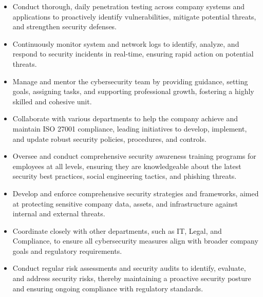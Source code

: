 \documentclass[10pt, letterpaper]{article}
\newenvironment{highlights}{
    \begin{itemize}[
        topsep=0.10 cm,
        parsep=0.10 cm,
        partopsep=0pt,
        itemsep=0pt,
        leftmargin=0 cm + 10pt
    ]
}{
    \end{itemize}
} %
\begin{document}
        \vspace{0.10 cm}
        \begin{justify}
            \begin{highlights}
             \item Conduct thorough, daily penetration testing across company systems and applications to proactively identify vulnerabilities, mitigate potential threats, and strengthen security defenses.
             
             \item Continuously monitor system and network logs to identify, analyze, and respond to security incidents in real-time, ensuring rapid action on potential threats.
             
             \item Manage and mentor the cybersecurity team by providing guidance, setting goals, assigning tasks, and supporting professional growth, fostering a highly skilled and cohesive unit.
             
             \item Collaborate with various departments to help the company achieve and maintain ISO 27001 compliance, leading initiatives to develop, implement, and update robust security policies, procedures, and controls.
             
             \item Oversee and conduct comprehensive security awareness training programs for employees at all levels, ensuring they are knowledgeable about the latest security best practices, social engineering tactics, and phishing threats.
             
             \item Develop and enforce comprehensive security strategies and frameworks, aimed at protecting sensitive company data, assets, and infrastructure against internal and external threats.
             
             \item Coordinate closely with other departments, such as IT, Legal, and Compliance, to ensure all cybersecurity measures align with broader company goals and regulatory requirements.
             
             \item Conduct regular risk assessments and security audits to identify, evaluate, and address security risks, thereby maintaining a proactive security posture and ensuring ongoing compliance with regulatory standards.
             

\end{highlights}
\end{justify}
\end{document}
